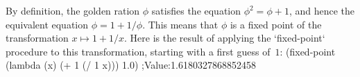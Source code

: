 By definition, the golden ration $\phi$ satisfies the equation $\phi^2 = \phi + 1$, and hence the equivalent equation $\phi = 1 + 1/\phi$.  This means that $\phi$ is a fixed point of the transformation $x \mapsto 1 + 1/x$.
Here is the result of applying the `fixed-point` procedure to this transformation, starting with a first guess of~$1$:
\begtt\scm
(fixed-point (lambda (x) (+ 1 (/ 1 x))) 1.0)
;Value:1.6180327868852458
\endtt
